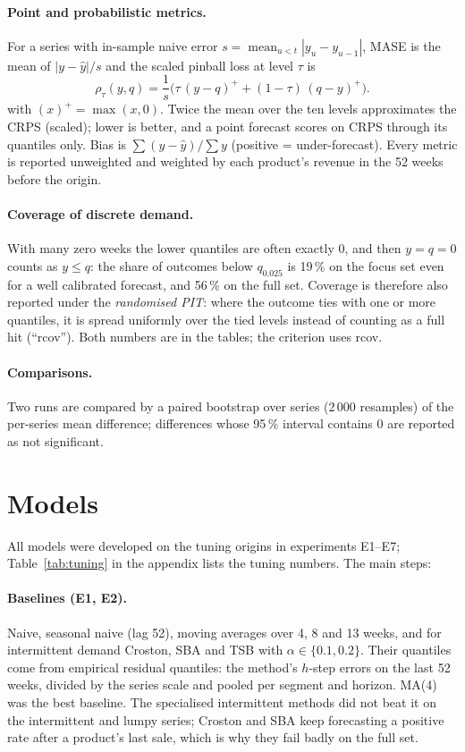 \documentclass[11pt,a4paper]{article}
\begin{document}
\paragraph{Point and probabilistic metrics.} For a series with in-sample naive error
$s = \operatorname{mean}_{u<t} |y_u - y_{u-1}|$, MASE is the mean of $|y - \hat y|/s$ and the
scaled pinball loss at level $\tau$ is
\begin{equation}
  \rho_\tau(y, q) = \frac{1}{s}\bigl(\tau\,(y - q)^+ + (1 - \tau)\,(q - y)^+\bigr).
\end{equation}
with $(x)^+ = \max(x, 0)$. Twice the mean over the ten levels approximates the CRPS (scaled); lower is better, and a
point forecast scores on CRPS through its quantiles only. Bias is $\sum (y - \hat y) /
\sum y$ (positive = under-forecast). Every metric is reported unweighted and weighted by each
product's revenue in the 52 weeks before the origin.

\paragraph{Coverage of discrete demand.} With many zero weeks the lower quantiles are often
exactly 0, and then $y = q = 0$ counts as $y \le q$: the share of outcomes below $q_{0.025}$
is 19\,\% on the focus set even for a well calibrated forecast, and 56\,\% on the full set.
Coverage is therefore also reported under the \emph{randomised PIT}: where the outcome ties
with one or more quantiles, it is spread uniformly over the tied levels instead of counting as a
full hit (``rcov''). Both numbers are in the tables; the criterion uses rcov.

\paragraph{Comparisons.} Two runs are compared by a paired bootstrap over series (2\,000
resamples) of the per-series mean difference; differences whose 95\,\% interval contains 0 are
reported as not significant.

\section{Models}
\label{sec:models}

All models were developed on the tuning origins in experiments E1--E7; Table~\ref{tab:tuning}
in the appendix lists the tuning numbers. The main steps:

\paragraph{Baselines (E1, E2).} Naive, seasonal naive (lag 52), moving averages over 4, 8 and
13 weeks, and for intermittent demand Croston, SBA and TSB with $\alpha \in \{0.1, 0.2\}$.
Their quantiles come from empirical residual quantiles: the method's $h$-step errors on the last
52 weeks, divided by the series scale and pooled per segment and horizon. MA(4) was the best
baseline. The specialised intermittent methods did not beat it on the intermittent and lumpy
series; Croston and SBA keep forecasting a positive rate after a product's last sale, which is
why they fail badly on the full set.
\end{document}

